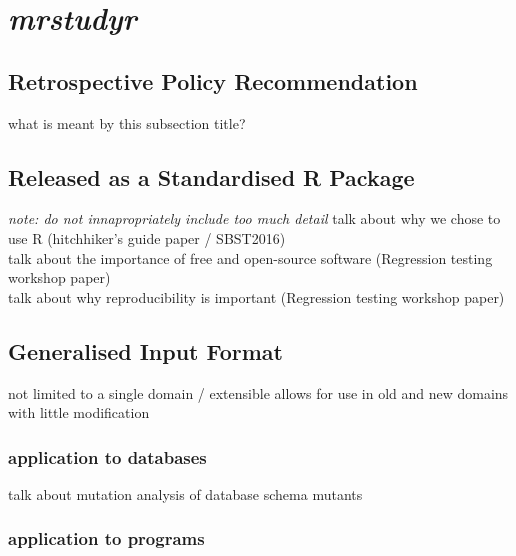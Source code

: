 \section{\textit{mrstudyr}}
\subsection{Retrospective Policy Recommendation}
what is meant by this subsection title?

\subsection{Released as a Standardised R Package}
\textit{note: do not innapropriately include too much detail}
talk about why we chose to use R (hitchhiker's guide paper / SBST2016)\\
talk about the importance of free and open-source software (Regression testing workshop paper)\\
talk about why reproducibility is important (Regression testing workshop paper)

\subsection{Generalised Input Format}
not limited to a single domain / extensible
allows for use in old and new domains with little modification
    \subsubsection{application to databases}
    talk about mutation analysis of database schema mutants
    \subsubsection{application to programs}


